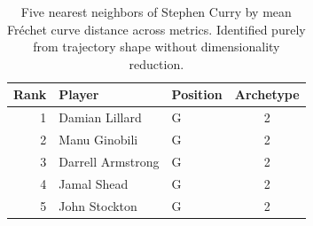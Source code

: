\begin{table}[htbp]
  \centering\small
  \begin{tabular}{rllc}
    \toprule
    Rank & Player & Position & Archetype \\
    \midrule
    1 & Damian Lillard & G & 2 \\
    2 & Manu Ginobili & G & 2 \\
    3 & Darrell Armstrong & G & 2 \\
    4 & Jamal Shead & G & 2 \\
    5 & John Stockton & G & 2 \\
    \bottomrule
  \end{tabular}
  \caption{Five nearest neighbors of Stephen Curry by mean Fr\'{e}chet curve distance across metrics. Identified purely from trajectory shape without dimensionality reduction.}
  \label{tab:Stephen_Curry_frechet_curve_neighbors}
\end{table}

